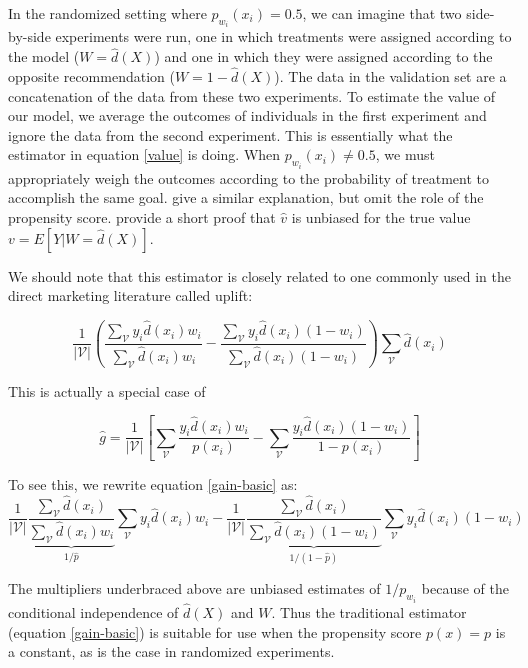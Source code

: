 In the randomized setting where $p_{w_i}(x_i) = 0.5$, we can imagine that two side-by-side experiments were run, one in which treatments were assigned according to the model ($W = \hat d(X)$) and one in which they were assigned according to the opposite recommendation ($W = 1 - \hat d(X)$). The data in the validation set are a concatenation of the data from these two experiments. To estimate the value of our model, we average the outcomes of individuals in the first experiment and ignore the data from the second experiment. This is essentially what the estimator in equation \ref{value} is doing. When $p_{w_i}(x_i) \ne 0.5$, we must appropriately weigh the outcomes according to the probability of treatment to accomplish the same goal. \citet{Kapelner:3baXYEjR} give a similar explanation, but omit the role of the propensity score. \citet{Zhao:2017wa} provide a short proof that $\hat v$ is unbiased for the true value $v = E[Y|W = \hat d(X)]$. 

We should note that this estimator is closely related to one commonly used in the direct marketing literature called uplift:

\begin{equation}
\label{gain-basic}
	\frac{1}{|\mathcal V |} \left(
		  \frac{\sum_{\mathcal{V}} y_i  \hat d(x_i) w_i}{\sum_{\mathcal{V}}  \hat d(x_i) w_i} - 
		  \frac{\sum_{\mathcal{V}} y_i  \hat d(x_i) (1-w_i)}{\sum_{\mathcal{V}}  \hat d(x_i)  (1-w_i)} 
		  \right)
		  \sum_{\mathcal{V}} \hat d(x_i) 
\end{equation}

This is actually a special case of

\begin{equation}
\label{gain}
	\hat g  = \dfrac{1}{|\mathcal V |} \left[ \sum_{\mathcal{V}} \dfrac{y_i  \hat d(x_i) w_i}{p(x_i)} - \sum_{\mathcal{V}} \dfrac{y_i  \hat d(x_i) (1-w_i)}{1-p(x_i)} \right]
\end{equation}

To see this, we rewrite equation \ref{gain-basic} as:
\[
	 \dfrac{1}{|\mathcal V |} \underbrace{ \frac{ \sum_{\mathcal{V}} \hat d(x_i)}{\sum_{\mathcal{V}}  \hat d(x_i) w_i} }_{1/\hat p}
		  	\sum_{\mathcal{V}} y_i  \hat d(x_i) w_i - 
		\dfrac{1}{|\mathcal V |}  \underbrace{ \frac{ \sum_{\mathcal{V}} \hat d(x_i)}{\sum_{\mathcal{V}}  \hat d(x_i)  (1-w_i)} }_{1/ (1-\hat p)}
		  	\sum_{\mathcal{V}} y_i  \hat d(x_i) (1-w_i) 
\]

The multipliers underbraced above are unbiased estimates of $1/ p_{w_i}$ because of the conditional independence of $\hat d(X)$ and $W$. Thus the traditional estimator (equation \ref{gain-basic}) is suitable for use when the propensity score $p(x) = p$ is a constant, as is the case in randomized experiments.

